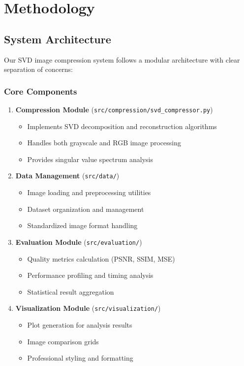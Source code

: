 \documentclass[12pt,a4paper]{article}
\begin{document}
\section{Methodology}

\subsection{System Architecture}

Our SVD image compression system follows a modular architecture with clear separation of concerns:

\subsubsection{Core Components}

\begin{enumerate}
    \item \textbf{Compression Module} (\texttt{src/compression/svd\_compressor.py})
    \begin{itemize}
        \item Implements SVD decomposition and reconstruction algorithms
        \item Handles both grayscale and RGB image processing
        \item Provides singular value spectrum analysis
    \end{itemize}
    
    \item \textbf{Data Management} (\texttt{src/data/})
    \begin{itemize}
        \item Image loading and preprocessing utilities
        \item Dataset organization and management
        \item Standardized image format handling
    \end{itemize}
    
    \item \textbf{Evaluation Module} (\texttt{src/evaluation/})
    \begin{itemize}
        \item Quality metrics calculation (PSNR, SSIM, MSE)
        \item Performance profiling and timing analysis
        \item Statistical result aggregation
    \end{itemize}
    
    \item \textbf{Visualization Module} (\texttt{src/visualization/})
    \begin{itemize}
        \item Plot generation for analysis results
        \item Image comparison grids
        \item Professional styling and formatting
    \end{itemize}
    

\end{enumerate}
\end{document}
